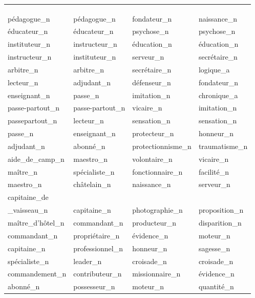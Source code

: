 \begin{table}
    \centering
    \begin{tabularx}{\textwidth}{*{4}{P{.23\textwidth}}}
     \\
     \\
    \toprule
     & &  &  \\
    \toprule
    pédagogue\_n & pédagogue\_n & fondateur\_n & naissance\_n\\
éducateur\_n & éducateur\_n & psychose\_n & psychose\_n\\
instituteur\_n & instructeur\_n & éducation\_n & éducation\_n\\
instructeur\_n & instituteur\_n & serveur\_n & secrétaire\_n\\
arbitre\_n & arbitre\_n & secrétaire\_n & logique\_a\\
lecteur\_n & adjudant\_n & défenseur\_n & fondateur\_n\\
enseignant\_n & passe\_n & imitation\_n & chronique\_a\\
passe-partout\_n & passe-partout\_n & vicaire\_n & imitation\_n\\
passepartout\_n & lecteur\_n & sensation\_n & sensation\_n\\
passe\_n & enseignant\_n & protecteur\_n & honneur\_n\\
adjudant\_n & abonné\_n & protectionnisme\_n & traumatisme\_n\\
aide\_de\_camp\_n & maestro\_n & volontaire\_n & vicaire\_n\\
maître\_n & spécialiste\_n & fonctionnaire\_n & facilité\_n\\
maestro\_n & châtelain\_n & naissance\_n & serveur\_n\\
capitaine\_de\\ \_vaisseau\_n & capitaine\_n & photographie\_n & proposition\_n\\
maître\_d'hôtel\_n & commandant\_n & producteur\_n & disparition\_n\\
commandant\_n & propriétaire\_n & évidence\_n & moteur\_n\\
capitaine\_n & professionnel\_n & honneur\_n & sagesse\_n\\
spécialiste\_n & leader\_n & croisade\_n & croisade\_n\\
commandement\_n & contributeur\_n & missionnaire\_n & évidence\_n\\
abonné\_n & possesseur\_n & moteur\_n & quantité\_n\\

\end{tabularx}
\end{table}
